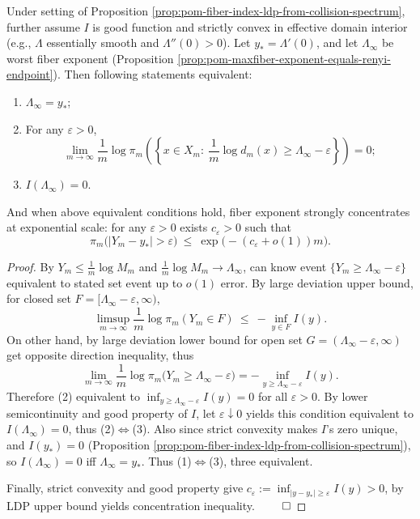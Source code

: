 \begin{proposition}[Saturation phase characterization: \texorpdfstring{$\Lambda_\infty=y_\ast$}{Lambda_infty=y*} iff fiber exponent concentrates at exponential scale]\label{prop:pom-saturation-phase-characterization}
Under setting of Proposition \ref{prop:pom-fiber-index-ldp-from-collision-spectrum}, further assume \(I\) is good function and strictly convex in effective domain interior (e.g., \(\Lambda\) essentially smooth and \(\Lambda''(0)>0\)).
Let \(y_\ast=\Lambda'(0)\), and let \(\Lambda_\infty\) be worst fiber exponent (Proposition \ref{prop:pom-maxfiber-exponent-equals-renyi-endpoint}).
Then following statements equivalent:
\begin{enumerate}
  \item \(\Lambda_\infty=y_\ast\);
  \item For any \(\varepsilon>0\),
  \[
  \lim_{m\to\infty}\frac{1}{m}\log \pi_m\!\left(\left\{x\in X_m:\ \frac{1}{m}\log d_m(x)\ge \Lambda_\infty-\varepsilon\right\}\right)=0;
  \]
  \item \(I(\Lambda_\infty)=0\).
\end{enumerate}
And when above equivalent conditions hold, fiber exponent strongly concentrates at exponential scale: for any \(\varepsilon>0\) exists \(c_\varepsilon>0\) such that
\[
\pi_m\bigl(|Y_m-y_\ast|>\varepsilon\bigr)\ \le\ \exp\!\bigl(-(c_\varepsilon+o(1))m\bigr).
\]
\end{proposition}
\begin{proof}
By \(Y_m\le \frac{1}{m}\log M_m\) and \(\frac{1}{m}\log M_m\to \Lambda_\infty\), can know event \(\{Y_m\ge \Lambda_\infty-\varepsilon\}\) equivalent to stated set event up to \(o(1)\) error.
By large deviation upper bound, for closed set \(F=[\Lambda_\infty-\varepsilon,\infty)\),
\[
\limsup_{m\to\infty}\frac{1}{m}\log \pi_m(Y_m\in F)\ \le\ -\inf_{y\in F}I(y).
\]
On other hand, by large deviation lower bound for open set \(G=(\Lambda_\infty-\varepsilon,\infty)\) get opposite direction inequality, thus
\[
\lim_{m\to\infty}\frac{1}{m}\log \pi_m\bigl(Y_m\ge \Lambda_\infty-\varepsilon\bigr)
=-\inf_{y\ge \Lambda_\infty-\varepsilon}I(y).
\]
Therefore (2) equivalent to \(\inf_{y\ge \Lambda_\infty-\varepsilon}I(y)=0\) for all \(\varepsilon>0\).
By lower semicontinuity and good property of \(I\), let \(\varepsilon\downarrow 0\) yields this condition equivalent to \(I(\Lambda_\infty)=0\), thus (2)\(\Leftrightarrow\)(3).
Also since strict convexity makes \(I\)'s zero unique, and \(I(y_\ast)=0\) (Proposition \ref{prop:pom-fiber-index-ldp-from-collision-spectrum}), so \(I(\Lambda_\infty)=0\) iff \(\Lambda_\infty=y_\ast\). Thus (1)\(\Leftrightarrow\)(3), three equivalent.
\par
Finally, strict convexity and good property give
\(
c_\varepsilon:=\inf_{|y-y_\ast|\ge \varepsilon}I(y)>0
\),
by LDP upper bound yields concentration inequality. $\qed$
\end{proof}

